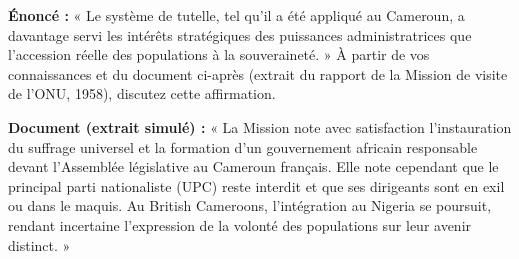 \documentclass[11pt]{article}
\begin{document}
\begin{exoresolu}
\textbf{Énoncé :} « Le système de tutelle, tel qu'il a été appliqué au Cameroun, a davantage servi les intérêts stratégiques des puissances administratrices que l'accession réelle des populations à la souveraineté. » À partir de vos connaissances et du document ci-après (extrait du rapport de la Mission de visite de l'ONU, 1958), discutez cette affirmation.

\textbf{Document (extrait simulé) :} « La Mission note avec satisfaction l'instauration du suffrage universel et la formation d'un gouvernement africain responsable devant l'Assemblée législative au Cameroun français. Elle note cependant que le principal parti nationaliste (UPC) reste interdit et que ses dirigeants sont en exil ou dans le maquis. Au British Cameroons, l'intégration au Nigeria se poursuit, rendant incertaine l'expression de la volonté des populations sur leur avenir distinct. »


\end{exoresolu}
\end{document}
